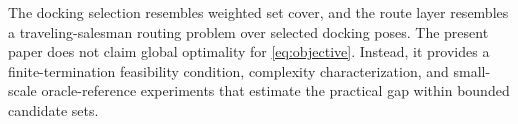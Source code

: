 \begin{remark}
The docking selection resembles weighted set cover, and the route layer resembles a traveling-salesman routing problem over selected docking poses. The present paper does not claim global optimality for \eqref{eq:objective}. Instead, it provides a finite-termination feasibility condition, complexity characterization, and small-scale oracle-reference experiments that estimate the practical gap within bounded candidate sets.
\end{remark}
